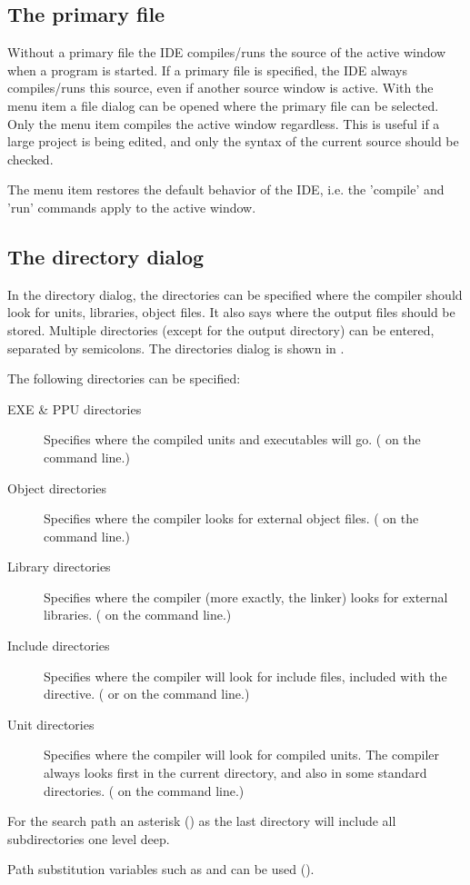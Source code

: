 \subsection{The primary file}
\label{se:primaryfile}
Without a primary file the IDE compiles/runs the source of the active
window when a program is started. If a primary file is specified,
the IDE always compiles/runs this source, even if another
source window is active. With the menu item 
a file dialog can be opened where the primary file can be selected.
Only the menu item  compiles the active window
regardless. This is useful if a large project is being edited, and 
only the syntax of the current source should be checked.

The menu item  restores the default
behavior of the IDE, i.e. the 'compile' and 'run' commands apply to the
active window.
%
%
\subsection{The directory dialog}
\label{se:directorydialog}
In the directory dialog, the directories can be specified where the
compiler should look for units, libraries, object files. It also says
where the output files should be stored. Multiple directories (except
for the output directory) can be entered, separated by semicolons.
The directories dialog is shown in .


The following directories can be specified:
\begin{description}
\item[EXE \& PPU directories] Specifies where the compiled units and
executables will go. ( on the command line.)
\item[Object directories] Specifies where the compiler looks for external
object files. ( on the command line.)
\item[Library directories] Specifies where the compiler (more exactly, the
linker) looks for external libraries. ( on the command line.)
\item[Include directories] Specifies where the compiler will look for
include files, included with the  directive.
( or  on the command line.)
\item[Unit directories] Specifies where the compiler will look for compiled
units. The compiler always looks first in the current directory, and also in
some standard directories. ( on the command line.)
\end{description}
\begin{remark}
For the search path an asterisk (\var{*}) as the last directory will include all
subdirectories one level deep.

Path substitution variables such as and can
be used ().
\end{remark}
%
%
